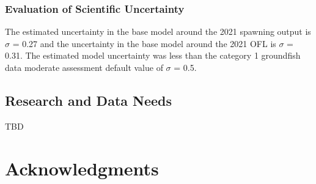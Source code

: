 \documentclass[11pt,
  english,
  a4paper,
]{article}
\begin{document}
\hypertarget{evaluation-of-scientific-uncertainty}{%
\subsubsection{Evaluation of Scientific Uncertainty}\label{evaluation-of-scientific-uncertainty}}

\leavevmode\tagmcend\tagstructend


The estimated uncertainty in the base model around the 2021 spawning output is {\(\sigma\)\leavevmode\tagmcend\tagstructend} = 0.27 and the uncertainty in the base model around the 2021 OFL is {\(\sigma\)\leavevmode\tagmcend\tagstructend} = 0.31. The estimated model uncertainty was less than the category 1 groundfish data moderate assessment default value of {\(\sigma\)\leavevmode\tagmcend\tagstructend} = 0.5.

\leavevmode\tagmcend\tagstructend\par


\hypertarget{research-and-data-needs-1}{%
\subsection{Research and Data Needs}\label{research-and-data-needs-1}}

\leavevmode\tagmcend\tagstructend


TBD

\leavevmode\tagmcend\tagstructend\par


\hypertarget{acknowledgments}{%
\section{Acknowledgments}\label{acknowledgments}}

\leavevmode\tagmcend\tagstructend

\end{document}
